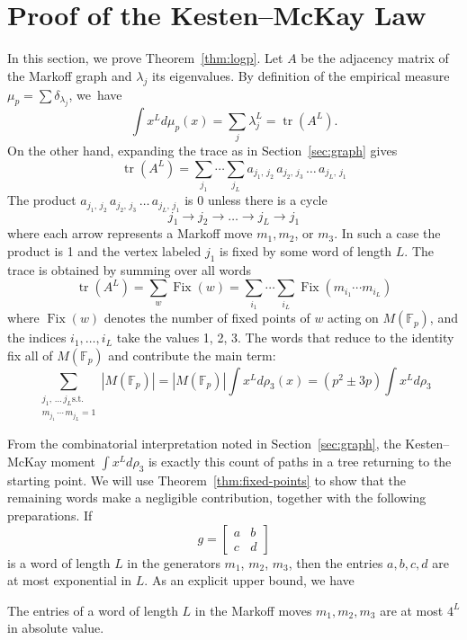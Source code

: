 \documentclass[AHL, Unicode, longabstracts, published]{cedram}
\newcommand{\F}{\mathbb{F}}
\DeclareMathOperator{\tr}{tr}
\DeclareMathOperator{\Fix}{Fix}
\begin{document}
\section{Proof of the Kesten--McKay Law} \label{sec:wrap-up}

In this section, we prove Theorem~\ref{thm:logp}. Let $A$ be the adjacency matrix of the Markoff graph and $\lambda_j$ its eigenvalues. By definition of the empirical measure $\mu_p = \sum \delta_{\lambda_j}$, we~have
\[
\int x^L d\mu_p(x) = \sum_j \lambda_j^L = \tr\left(A^L\right).
\]
On the other hand, expanding the trace as in Section~\ref{sec:graph} gives
\[
\tr\left(A^L\right) = \sum_{j_1} \cdots \sum_{j_L} a_{j_1,\,j_2}\,a_{j_2,\,j_3}\,\ldots\,a_{j_L,\,j_1}
\]
The product $a_{j_1,\,j_2}\,a_{j_2,\,j_3}\,\ldots \,a_{j_L,\,j_1}$ is 0 unless there is a cycle
\[
j_1 \rightarrow j_2 \rightarrow \ldots \rightarrow j_L \rightarrow j_1
\]
where each arrow represents a Markoff move $m_1, m_2$, or $m_3$. In such a case the product is 1 and the vertex labeled $j_1$ is fixed by some word of length $L$. The trace is obtained by summing over all words
\[
\tr(A^L) = \sum_w \Fix(w) = \sum_{i_1} \cdots \sum_{i_L} \Fix(m_{i_1}\cdots m_{i_L})
\]
where $\Fix(w)$ denotes the number of fixed points of $w$ acting on $M(\F_p)$, and the indices $i_1, \ldots, i_L$ take the values 1, 2, 3. The words that reduce to the identity fix all of $M(\F_p)$ and contribute the main term:
\[
\sum_{\substack{j_1,\,\ldots\,j_L \text{s.t.} \\ m_{j_1}\,\cdots\,m_{j_L}=1 }} |M(\F_p)| = |M(\F_p)| \int x^L d\rho_3(x) = \left(p^2 \pm 3p\right)\int x^L d\rho_3
\]

From the combinatorial interpretation noted in Section~\ref{sec:graph}, the Kesten--McKay moment $\int x^L d\rho_3$ is exactly this count of paths in a tree returning to the starting point. We will use Theorem~\ref{thm:fixed-points} to show that the remaining words make a negligible contribution, together with the following preparations. If
\[
g =
\begin{bmatrix}
a & b \\
c & d
\end{bmatrix}
\]
is a word of length $L$ in the generators $m_1$, $m_2$, $m_3$, then the entries $a, b, c, d$ are at most exponential in $L$. As an explicit upper bound, we have

\goodbreak
\begin{prop}\label{prop:bound-entries}
The entries of a word of length $L$ in the Markoff moves $m_1,m_2,m_3$ are at most $4^L$ in absolute value.
\end{prop}
\end{document}
